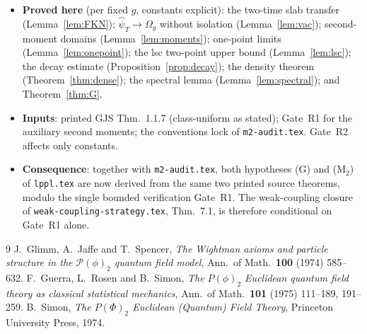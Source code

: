 \documentclass[11pt,a4paper]{article}
\theoremstyle{plain}
\theoremstyle{definition}
\newcommand{\Om}{\Omega}
\begin{document}
\begin{itemize}
\item \textbf{Proved here} (per fixed $g$, constants explicit): the two-time slab transfer
      (Lemma~\ref{lem:FKN}); $\hat\psi_T\to\Om_g$ without isolation (Lemma~\ref{lem:vac});
      second-moment domains (Lemma~\ref{lem:moments}); one-point limits
      (Lemma~\ref{lem:onepoint}); the lsc two-point upper bound (Lemma~\ref{lem:lsc}); the decay
      estimate (Proposition~\ref{prop:decay}); the density theorem (Theorem~\ref{thm:dense});
      the spectral lemma (Lemma~\ref{lem:spectral}); and Theorem~\ref{thm:G}.
\item \textbf{Inputs}: printed GJS Thm.~1.1.7 (class-uniform as stated); Gate~R1 for the
      auxiliary second moments; the conventions lock of \texttt{m2-audit.tex}. Gate~R2 affects
      only constants.
\item \textbf{Consequence}: together with \texttt{m2-audit.tex}, both hypotheses (G) and (M$_2$)
      of \texttt{lppl.tex} are now derived from the same two printed source theorems, modulo the
      single bounded verification Gate~R1. The weak-coupling closure of
      \texttt{weak-coupling-strategy.tex}, Thm.~7.1, is therefore conditional on Gate~R1 alone.
\end{itemize}

\begin{thebibliography}{9}
 J.~Glimm, A.~Jaffe and T.~Spencer, \emph{The Wightman axioms and particle structure
in the $\mathscr P(\phi)_2$ quantum field model}, Ann.\ of Math.\ \textbf{100} (1974) 585--632.
 F.~Guerra, L.~Rosen and B.~Simon, \emph{The $P(\phi)_2$ Euclidean quantum field
theory as classical statistical mechanics}, Ann.\ of Math.\ \textbf{101} (1975) 111--189, 191--259.
 B.~Simon, \emph{The $P(\Phi)_2$ Euclidean (Quantum) Field Theory}, Princeton
University Press, 1974.
\end{thebibliography}
\end{document}
